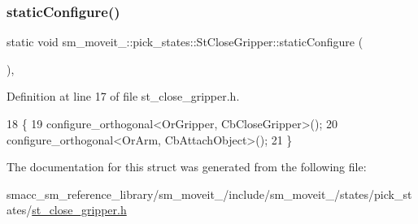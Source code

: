 \subsubsection{\texorpdfstring{static\+Configure()}{staticConfigure()}}
{\footnotesize\ttfamily static void sm\+\_\+moveit\+\_\+::pick\+\_\+states\+::\+St\+Close\+Gripper\+::static\+Configure (\begin{DoxyParamCaption}{ }\end{DoxyParamCaption})\hspace{0.3cm}{\ttfamily [inline]}, {\ttfamily [static]}}



Definition at line 17 of file st\+\_\+close\+\_\+gripper.\+h.


\begin{DoxyCode}
18          \{
19             configure\_orthogonal<OrGripper, CbCloseGripper>();
20             configure\_orthogonal<OrArm, CbAttachObject>();
21          \}
\end{DoxyCode}


The documentation for this struct was generated from the following file\+:\begin{DoxyCompactItemize}
\item 
smacc\+\_\+sm\+\_\+reference\+\_\+library/sm\+\_\+moveit\+\_/include/sm\+\_\+moveit\+\_/states/pick\+\_\+states/\hyperlink{4_2include_2sm__moveit__4_2states_2pick__states_2st__close__gripper_8h}{st\+\_\+close\+\_\+gripper.\+h}\end{DoxyCompactItemize}
